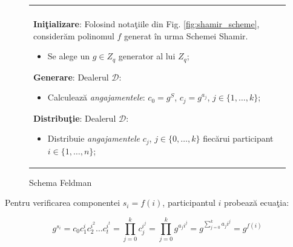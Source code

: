 \documentclass{llncs}
\begin{document}
\begin{figure}[h!]

\begin{tabular}{|p{\textwidth}|}
\hline

\\
\hspace{.1in}
\textbf{Ini\c{t}ializare}: 
	Folosind nota\c{t}iile din Fig. \ref{fig:shamir_scheme}, consider\u{a}m polinomul $f$ generat \^{i}n urma Schemei Shamir.
	\begin{itemize}
		\item Se alege un $g \in Z_q$ generator al lui $Z_q$;
	\end{itemize}
\medskip

\hspace{.1in}
\textbf{Generare}: Dealerul $\mathcal{D}$:
	\begin{itemize}
		\item Calculeaz\u{a} \textit{angajamentele}: $c_0 = g^S$, $c_j = g^{a_j}$, $j \in \{1,\dots,k\}$;
	\end{itemize}
\medskip

\hspace{.1in}
\textbf{Distribu\c{t}ie}: Dealerul $\mathcal{D}$:
	\begin{itemize}
		\item Distribuie \textit{angajamentele} $c_j$, $j \in \{0,\dots,k\}$ fiec\u{a}rui participant $i\in \{1,\dots,n\}$;
	\end{itemize}

\hspace{.1in}
\\
\hline
\end{tabular}

\caption{Schema Feldman \cite{Feldman:1987}}
\label{fig:feldman_scheme}
\end{figure}

Pentru verificarea componentei $s_i = f(i)$, participantul $i$ probeaz\u{a} ecua\c{t}ia:

\begin{equation}
	g^{s_i} = c_0c_1^ic_2^{i^2} \dots c_t^{i^t} = \prod_{j=0}^k c_j^{i^j} = \prod_{j=0}^k g^{a_ji^j} = g^{\sum\limits_{j=0}^k a_ji^j} = g^{f(i)}
\end{equation}
\end{document}
